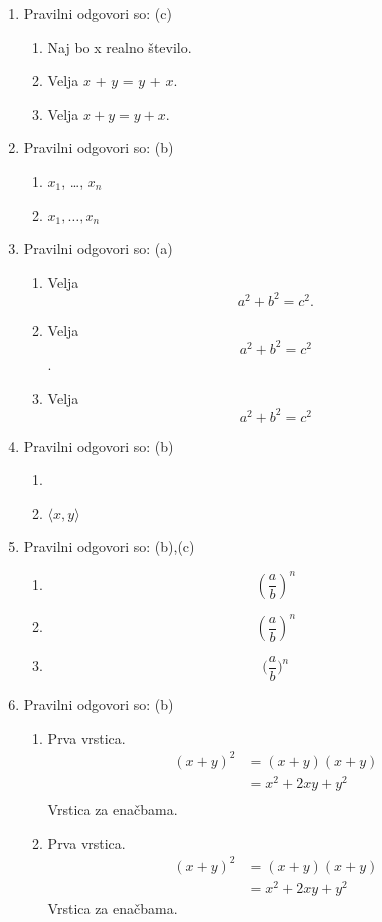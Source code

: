 \documentclass[11pt]{article}
\begin{document}
\begin{enumerate}
    \item Pravilni odgovori so: (c)
    \begin{enumerate}
        \item Naj bo x realno število.
        \item Velja \(x\) + \(y\) = \(y\) + \(x\).
        \item Velja \(x + y = y + x\).
    \end{enumerate}

    \item Pravilni odgovori so: (b)
    \begin{enumerate}
        \item \(x_1\), \dots, \(x_n\)
        \item \(x_1, \ldots, x_n\)
    \end{enumerate}

    \item Pravilni odgovori so: (a)
    \begin{enumerate}
        \item
Velja
\[
  a^2 + b^2 = c^2.
\]
        \item
Velja
\[
  a^2 + b^2 = c^2
\]
.
        \item
Velja
\[
  a^2 + b^2 = c^2
\]
    \end{enumerate}

    \item Pravilni odgovori so: (b)
    \begin{enumerate}
        \item \(<x, y>\)
        \item \(\langle x, y \rangle\)
    \end{enumerate}

    \item Pravilni odgovori so: (b),(c)
    \begin{enumerate}
        \item \[ (\frac{a}{b})^n \]
        \item \[ \left(\frac{a}{b}\right)^n \]
        \item \[ \Big(\frac{a}{b}\Big)^n \]
    \end{enumerate}

    \item Pravilni odgovori so: (b)
    \begin{enumerate}
        \item Prva vrstica.
\begin{align*}
  (x + y)^2 &= (x + y)(x + y) \\
  &= x^2 + 2 x y + y^2 \\
\end{align*}
        Vrstica za enačbama.
        \item Prva vrstica.
\begin{align*}
  (x + y)^2 &= (x + y)(x + y) \\
  &= x^2 + 2 x y + y^2
\end{align*}
        Vrstica za enačbama.
    \end{enumerate}


\end{enumerate}
\end{document}
